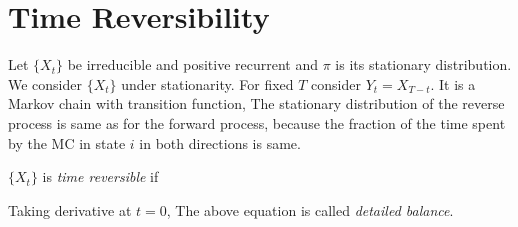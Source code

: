 \documentclass[all-lectures.tex]{subfiles}
\begin{document}
\section{Time Reversibility}
Let $\{X_t\}$ be irreducible and positive recurrent and $\pi$ is its stationary distribution. 
We consider $\{X_t\}$ under stationarity. 
For fixed $T$ consider $Y_t = X_{T-t}$. It is a Markov chain with transition function, 
The stationary distribution of the reverse process is same as for the forward process, because the fraction of the time spent by  the MC in state $i$ in both directions is same.
\begin{defn}
$\{X_t\}$ is \textit{time reversible} if 
\end{defn}
Taking derivative at $t=0$,
The above equation is called \textit{detailed balance}. 
\end{document}

